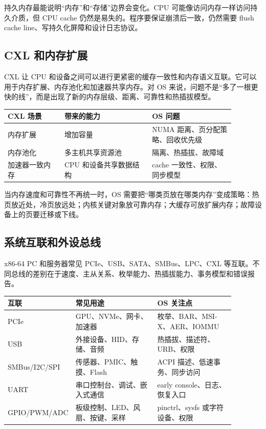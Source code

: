 持久内存最能说明“内存”和“存储”边界会变化。CPU 可能像访问内存一样访问持久介质，但 CPU cache 仍然是易失的。程序要保证崩溃后一致，仍然需要 flush cache line、写持久化屏障和设计日志协议。

\subsection{CXL 和内存扩展}

CXL 让 CPU 和设备之间可以进行更紧密的缓存一致性和内存语义互联。它可以用于内存扩展、内存池化和加速器共享内存。对 OS 来说，问题不是“多了一根更快的线”，而是出现了新的内存层级、距离、可靠性和热插拔模型。

\begin{longtable}{p{0.22\linewidth}p{0.34\linewidth}p{0.32\linewidth}}
\toprule
CXL 场景 & 带来的能力 & OS 问题 \\
\midrule
内存扩展 & 增加容量 & NUMA 距离、页分配策略、回收优先级 \\
内存池化 & 多主机共享资源池 & 隔离、热插拔、故障域 \\
加速器一致内存 & CPU 和设备共享数据结构 & cache 一致性、权限、同步模型 \\
\bottomrule
\end{longtable}

当内存速度和可靠性不再统一时，OS 需要把“哪类页放在哪类内存”变成策略：热页放近处，冷页放远处；内核关键对象放可靠内存；大缓存可放扩展内存；故障设备上的页要迁移或下线。

\subsection{系统互联和外设总线}

x86-64 PC 和服务器常见 PCIe、USB、SATA、SMBus、LPC、CXL 等互联。不同总线的差别在于速度、主从关系、枚举能力、热插拔能力、事务模型和错误报告。

\begin{longtable}{p{0.18\linewidth}p{0.36\linewidth}p{0.34\linewidth}}
\toprule
互联 & 常见用途 & OS 关注点 \\
\midrule
PCIe & GPU、NVMe、网卡、加速器 & 枚举、BAR、MSI-X、AER、IOMMU \\
USB & 外接设备、HID、存储、音频 & 热插拔、描述符、URB、权限 \\
SMBus/I2C/SPI & 传感器、PMIC、触摸、Flash & ACPI 描述、低速事务、同步访问 \\
UART & 串口控制台、调试、嵌入式通信 & early console、日志、恢复入口 \\
GPIO/PWM/ADC & 板级控制、LED、风扇、按键、采样 & pinctrl、sysfs 或字符设备、权限 \\
\bottomrule
\end{longtable}

